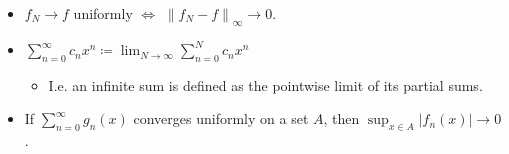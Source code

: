 \begin{concept}

\envlist

\begin{itemize}
\tightlist
\item
  \(f_N\to f\) uniformly \(\iff\)
  \({\left\lVert {f_N - f} \right\rVert}_\infty \to 0\).
\item
  \(\sum_{n=0}^\infty c_n x^n \coloneqq\lim_{N\to \infty} \sum_{n=0}^N c_n x^n\)

  \begin{itemize}
  \tightlist
  \item
    I.e. an infinite sum is defined as the pointwise limit of its
    partial sums.
  \end{itemize}
\item
  If \(\sum_{n=0}^\infty g_n(x)\) converges uniformly on a set \(A\),
  then \(\sup_{x\in A} {\left\lvert {f_n(x)} \right\rvert} \to 0\).
\end{itemize}

\end{concept}

